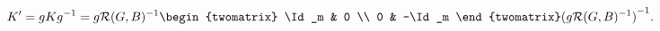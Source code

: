 \begin{equation}
\label{eq:Kp}
  K' = g K g^{-1} = g \mathcal{R}(G,B)^{-1} 
    \begin{twomatrix}
      \Id_m &   0 \\
        0   & -\Id_m
    \end{twomatrix}
    {(g \mathcal{R}(G,B)^{-1})}^{-1}.
\end{equation}

